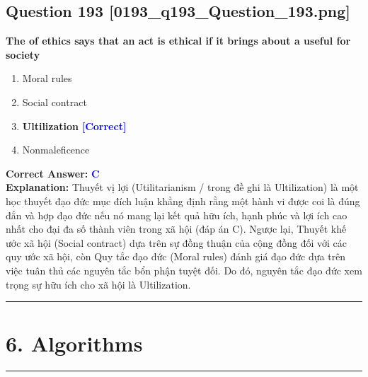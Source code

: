 \documentclass[11pt,a4paper]{article}
\begin{document}
\begin{minipage}{\textwidth}
\subsection*{Question 193 \quad \footnotesize{[0193\_q193\_Question\_193.png]}}
\noindent \textbf{The of ethics says that an act is ethical if it brings about a useful for society}

\begin{enumerate}[label=\Alph*.]
    \item Moral rules
    \item Social contract
    \item \textbf{Ultilization} \hfill \textcolor{blue}{\textbf{[Correct]}}
    \item Nonmaleficence
\end{enumerate}

\noindent \textbf{Correct Answer:} \textcolor{blue}{\textbf{C}} \\[2pt]
\noindent \textbf{Explanation:} Thuyết vị lợi (Utilitarianism / trong đề ghi là Ultilization) là một học thuyết đạo đức mục đích luận khẳng định rằng một hành vi được coi là đúng đắn và hợp đạo đức nếu nó mang lại kết quả hữu ích, hạnh phúc và lợi ích cao nhất cho đại đa số thành viên trong xã hội (đáp án C). Ngược lại, Thuyết khế ước xã hội (Social contract) dựa trên sự đồng thuận của cộng đồng đối với các quy ước xã hội, còn Quy tắc đạo đức (Moral rules) đánh giá đạo đức dựa trên việc tuân thủ các nguyên tắc bổn phận tuyệt đối. Do đó, nguyên tắc đạo đức xem trọng sự hữu ích cho xã hội là Ultilization.

\par\vspace{0.3cm}
\hrule
\vspace{0.3cm}
\end{minipage}


\newpage
\section*{6. Algorithms}
\hrule\vspace{0.5cm}
\end{document}
